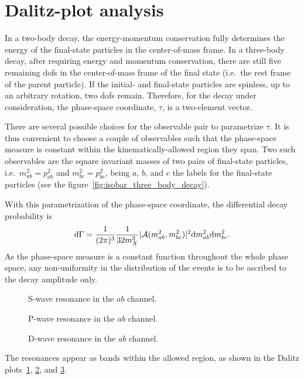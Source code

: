 \section{Dalitz-plot analysis}

    In a two-body decay, the energy-momentum conservation fully determines the energy of the final-state particles in the center-of-mass frame.
    In a three-body decay, after requiring energy and momentum conservation, there are still five remaining \acp{dof} in the center-of-mass frame of the final state (i.e.~the rest frame of the parent particle).
    If the initial- and final-state particles are spinless, up to an arbitrary rotation, two \acp{dof} remain.
    Therefore, for the decay under consideration, the phase-space coordinate, $\tau$, is a two-element vector.

   
   There are several possible choices for the observable pair to parametrize $\tau$.
    It is thus convenient to choose a couple of observables such that the phase-space measure is constant within the kinematically-allowed region they span.
    Two such observables are the square invariant masses of two pairs of final-state particles, i.e.~$m_{ab}^2 = p_{ab}^2$ and $m_{bc}^2 = p_{bc}^2$, being $a$, $b$, and $c$ the labels for the final-state particles (see the figure~\ref{fig:isobar_three_body_decay}).


    With this parametrization of the phase-space coordinate, the differential decay probability is
    \begin{equation}
        \mathop{}\!\textup{d}\Gamma = \frac{1}{(2\pi)^3}\frac{1}{32 m_X^3}\lvert\mathcal{A}(m_{ab}^2, m_{bc}^2)\rvert^2\!
        \mathop{}\!\textup{d} m_{ab}^2 \!\mathop{}\!\textup{d} m_{bc}^2.
    \end{equation}
    As the phase-space measure is a constant function throughout the whole phase space, any non-uniformity in the distribution of the events is to be ascribed to the decay amplitude only.
    \begin{figure}
        \centering
        
        \caption{S-wave resonance in the $ab$ channel.}
        \label{fig:s_wave_resonance_example}
    \end{figure}
    \begin{figure}
        \centering
        
        \caption{P-wave resonance in the $ab$ channel.}
        \label{fig:p_wave_resonance_example}
    \end{figure}
    \begin{figure}
        \centering
        
        \caption{D-wave resonance in the $ab$ channel.}
        \label{fig:d_wave_resonance_example}
    \end{figure}
    The resonances appear as bands within the allowed region, as shown in the Dalitz plots~\ref{fig:s_wave_resonance_example}, \ref{fig:p_wave_resonance_example}, and \ref{fig:d_wave_resonance_example}.



